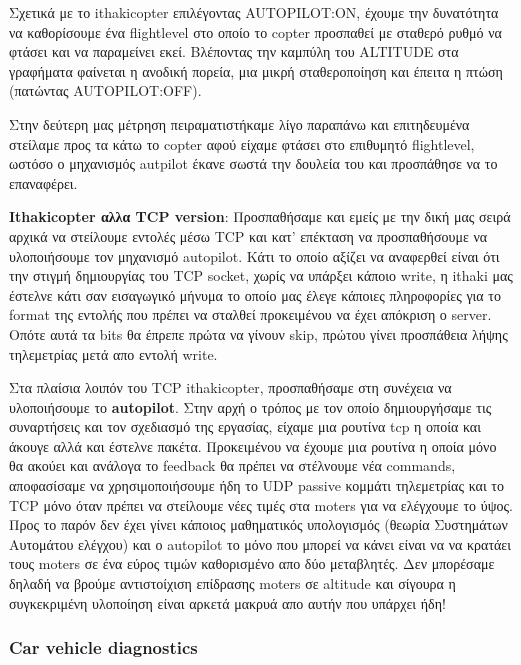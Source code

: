 \documentclass[hidelinks, 12pt, a4paper]{article}
\begin{document}
Σχετικά με το ithakicopter επιλέγοντας AUTOPILOT:ON, έχουμε την δυνατότητα να καθορίσουμε ένα flightlevel στο οποίο το copter προσπαθεί με σταθερό ρυθμό να φτάσει και να παραμείνει εκεί. Βλέποντας την καμπύλη του ALTITUDE στα γραφήματα φαίνεται η ανοδική πορεία, μια μικρή σταθεροποίηση και έπειτα η πτώση (πατώντας AUTOPILOT:OFF). 

Στην δεύτερη μας μέτρηση πειραματιστήκαμε λίγο παραπάνω και επιτηδευμένα στείλαμε προς τα κάτω το copter αφού είχαμε φτάσει στο επιθυμητό flightlevel, ωστόσο ο μηχανισμός autpilot έκανε σωστά την δουλεία του και προσπάθησε να το επαναφέρει.


\textbf{Ithakicopter αλλα TCP version}: Προσπαθήσαμε και εμείς με την δική μας σειρά αρχικά να στείλουμε εντολές μέσω TCP και κατ' επέκταση να προσπαθήσουμε να υλοποιήσουμε τον μηχανισμό autopilot. Κάτι το οποίο αξίζει να αναφερθεί είναι ότι την στιγμή δημιουργίας του TCP socket, χωρίς να υπάρξει κάποιο write, η ithaki μας έστελνε κάτι σαν εισαγωγικό μήνυμα το οποίο μας έλεγε κάποιες πληροφορίες για το format της εντολής που πρέπει να σταλθεί προκειμένου να έχει απόκριση ο server. Οπότε αυτά τα bits θα έπρεπε πρώτα να γίνουν skip, πρώτου γίνει προσπάθεια λήψης τηλεμετρίας μετά απο εντολή write. 

Στα πλαίσια λοιπόν του TCP ithakicopter, προσπαθήσαμε στη συνέχεια να υλοποιήσουμε το \textbf{autopilot}. Στην αρχή ο τρόπος με τον οποίο δημιουργήσαμε τις συναρτήσεις και τον σχεδιασμό της εργασίας, είχαμε μια ρουτίνα tcp η οποία και άκουγε αλλά και έστελνε πακέτα. Προκειμένου να έχουμε μια ρουτίνα η οποία μόνο θα ακούει και ανάλογα το feedback θα πρέπει να στέλνουμε νέα commands, αποφασίσαμε να χρησιμοποιήσουμε ήδη το  UDP passive κομμάτι τηλεμετρίας και το TCP μόνο όταν πρέπει να στείλουμε νέες τιμές στα moters για να ελέγχουμε το ύψος. Προς το παρόν δεν έχει γίνει κάποιος μαθηματικός υπολογισμός (θεωρία Συστημάτων Αυτομάτου ελέγχου) και ο autopilot το μόνο που μπορεί να κάνει είναι να να κρατάει τους moters σε ένα εύρος τιμών καθορισμένο απο δύο μεταβλητές. Δεν μπορέσαμε δηλαδή να βρούμε αντιστοίχιση επίδρασης moters σε altitude και σίγουρα η συγκεκριμένη υλοποίηση είναι αρκετά μακρυά απο αυτήν που υπάρχει ήδη! 

\subsubsection{Car vehicle diagnostics}
\end{document}
